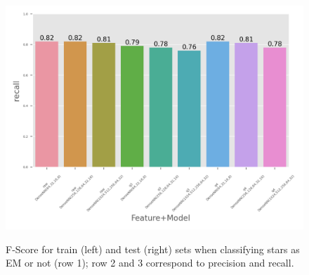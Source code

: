 \documentclass{article}
\begin{document}
\begin{figure}
    \includegraphics[width=0.49\linewidth]{plots/EvaluateClassifiers/aidelman_em_test_recall.png}\\
    \label{fig:aidelman_em}
    \caption{F-Score for train (left) and test (right) sets when classifying stars as EM or not (row 1); row 2 and 3 correspond to precision and recall.}
\end{figure}
\end{document}
